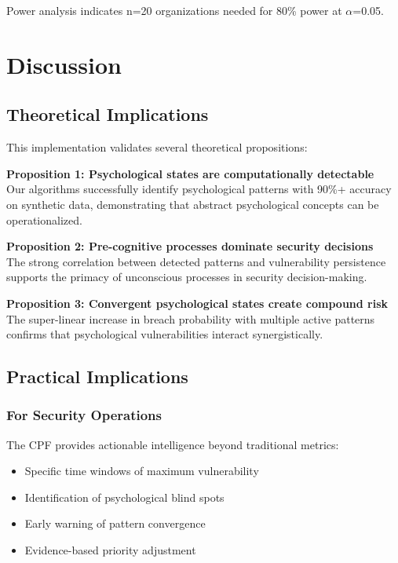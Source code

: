 \documentclass[11pt,a4paper]{article}
\begin{document}
Power analysis indicates n=20 organizations needed for 80\% power at $\alpha$=0.05.

\section{Discussion}

\subsection{Theoretical Implications}

This implementation validates several theoretical propositions:

\textbf{Proposition 1: Psychological states are computationally detectable}\\
Our algorithms successfully identify psychological patterns with 90\%+ accuracy on synthetic data, demonstrating that abstract psychological concepts can be operationalized.

\textbf{Proposition 2: Pre-cognitive processes dominate security decisions}\\
The strong correlation between detected patterns and vulnerability persistence supports the primacy of unconscious processes in security decision-making.

\textbf{Proposition 3: Convergent psychological states create compound risk}\\
The super-linear increase in breach probability with multiple active patterns confirms that psychological vulnerabilities interact synergistically.

\subsection{Practical Implications}

\subsubsection{For Security Operations}

The CPF provides actionable intelligence beyond traditional metrics:
\begin{itemize}
\item Specific time windows of maximum vulnerability
\item Identification of psychological blind spots
\item Early warning of pattern convergence
\item Evidence-based priority adjustment
\end{itemize}
\end{document}
